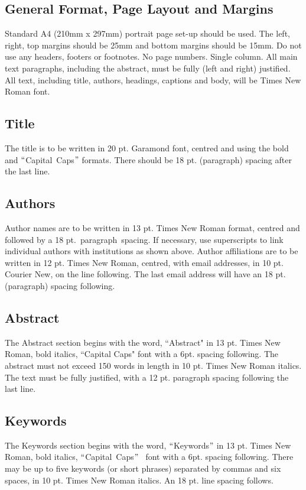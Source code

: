 \documentclass[11pt,twoside]{articleJJCIT}
\begin{document}
\subsection{General Format, Page Layout and Margins}

Standard A4 (210mm x 297mm) portrait page set-up should be used.  The left, right, top margins should be 25mm and bottom margins should be 15mm. Do not use any headers, footers or footnotes.  No page numbers. Single column.  All main text paragraphs, including the abstract, must be fully (left and right) justified.  All text, including title, authors, headings, captions and body, will be Times New Roman font.

\subsection{Title}
The title is to be written in 20 pt. Garamond font, centred and using the bold and $``$Capital\ Caps$"$  formats.  There should be 18 pt. (paragraph) spacing after the last line.

\subsection{Authors}

Author names are to be written in 13 pt. Times New Roman format, centred and followed by a 18 pt.\ paragraph\ spacing.  If necessary, use superscripts to link individual authors with institutions as shown above. Author affiliations are to be written in 12 pt. Times New Roman, centred, with email addresses, in 10 pt. Courier New, on the line following. The last email address will have an 18 pt. (paragraph) spacing following.

\subsection{Abstract}
The Abstract section begins with the word, ``Abstract"  in 13 pt. Times New Roman, bold italics, ``Capital Caps" font with a 6pt. spacing following.  The abstract must not exceed 150 words in length in 10 pt. Times New Roman italics.  The text must be fully justified, with a 12 pt. paragraph spacing following the last line.

\subsection{Keywords}
 The Keywords section begins with the word, $``$Keywords$"$  in 13 pt. Times New Roman, bold italics, $``$Capital\ Caps$"$ \ font with a 6pt. spacing following.  There may be up to five keywords (or short phrases) separated by commas and six spaces, in 10 pt. Times New Roman italics.  An 18 pt. line spacing follows.
\end{document}
